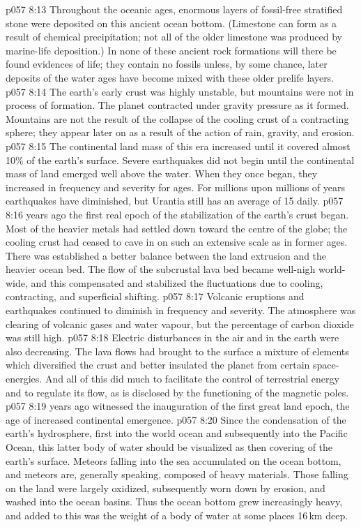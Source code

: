 \vs p057 8:13 Throughout the oceanic ages, enormous layers of fossil\hyp{}free stratified stone were deposited on this ancient ocean bottom. (Limestone can form as a result of chemical precipitation; not all of the older limestone was produced by marine\hyp{}life deposition.) In none of these ancient rock formations will there be found evidences of life; they contain no fossils unless, by some chance, later deposits of the water ages have become mixed with these older prelife layers.
\vs p057 8:14 The earth’s early crust was highly unstable, but mountains were not in process of formation. The planet contracted under gravity pressure as it formed. Mountains are not the result of the collapse of the cooling crust of a contracting sphere; they appear later on as a result of the action of rain, gravity, and erosion.
\vs p057 8:15 The continental land mass of this era increased until it covered almost 10\% of the earth’s surface. Severe earthquakes did not begin until the continental mass of land emerged well above the water. When they once began, they increased in frequency and severity for ages. For millions upon millions of years earthquakes have diminished, but Urantia still has an average of 15 daily.
\vs p057 8:16 \pc {} years ago the first real epoch of the stabilization of the earth’s crust began. Most of the heavier metals had settled down toward the centre of the globe; the cooling crust had ceased to cave in on such an extensive scale as in former ages. There was established a better balance between the land extrusion and the heavier ocean bed. The flow of the subcrustal lava bed became well\hyp{}nigh world\hyp{}wide, and this compensated and stabilized the fluctuations due to cooling, contracting, and superficial shifting.
\vs p057 8:17 Volcanic eruptions and earthquakes continued to diminish in frequency and severity. The atmosphere was clearing of volcanic gases and water vapour, but the percentage of carbon dioxide was still high.
\vs p057 8:18 Electric disturbances in the air and in the earth were also decreasing. The lava flows had brought to the surface a mixture of elements which diversified the crust and better insulated the planet from certain space\hyp{}energies. And all of this did much to facilitate the control of terrestrial energy and to regulate its flow, as is disclosed by the functioning of the magnetic poles.
\vs p057 8:19 \pc {} years ago witnessed the inauguration of the first great land epoch, the age of increased continental emergence.
\vs p057 8:20 Since the condensation of the earth’s hydrosphere, first into the world ocean and subsequently into the Pacific Ocean, this latter body of water should be visualized as then covering  of the earth’s surface. Meteors falling into the sea accumulated on the ocean bottom, and meteors are, generally speaking, composed of heavy materials. Those falling on the land were largely oxidized, subsequently worn down by erosion, and washed into the ocean basins. Thus the ocean bottom grew increasingly heavy, and added to this was the weight of a body of water at some places 16\,km deep.
